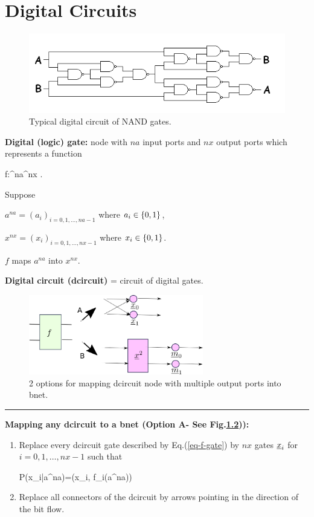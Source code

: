 \chapter{Digital Circuits}

\begin{figure}[h!]
\centering
\includegraphics[width=6in]{d-ckt/d-ckt.png}
\caption{Typical digital circuit
of NAND gates.}
\label{fig-d-ckt}
\end{figure}

{\bf Digital (logic) gate:} node with
$na$ input ports and $nx$ output ports
which represents a function

\beq
f:\bool^{na}\rarrow \bool^{nx}
\;.
\label{eq-f-gate}
\eeq

Suppose

$a^{na}=(a_i)_{i=0, 1,\dots, na-1}$ 
where $a_i\in \{0,1\}$,

$x^{nx}=(x_i)_{i=0, 1,\dots, nx-1}$ 
where $x_i\in \{0,1\}$. 

$f$ maps $a^{na}$ into $x^{nx}$.

{\bf Digital circuit (dcircuit)} = circuit of digital gates.

\begin{figure}[h!]
\centering
\includegraphics[width=3in]{d-ckt/d-ckt-2ops.png}
\caption{2 options
for mapping dcircuit node with
multiple output ports into bnet.}
\label{fig-d-ckt-2ops}
\end{figure}

\hrule\noindent
{\bf Mapping any
dcircuit to a bnet (Option A-
See Fig.\ref{fig-d-ckt-2ops})):}
\begin{enumerate}
\item
Replace every dcircuit  gate 
described by Eq.(\ref{eq-f-gate})
by
$nx$ gates ${\underline{x}}_i$
for $i=0, 1, \ldots, nx-1$
such that

\beq
P(x_i|a^{na})=\delta(x_i, f_i(a^{na}))
\eeq
\item
Replace
all connectors of the dcircuit
by arrows 
pointing in the direction
of the bit flow.

\end{enumerate}

